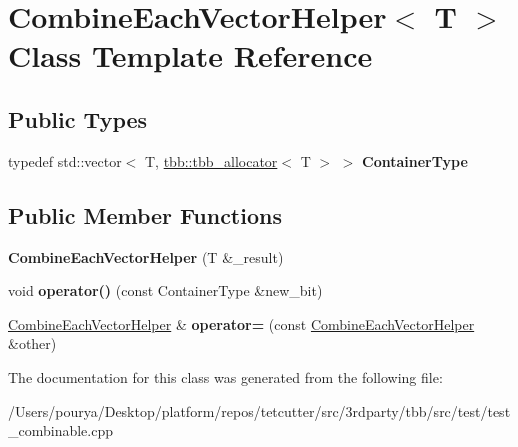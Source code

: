 \hypertarget{classCombineEachVectorHelper}{}\section{Combine\+Each\+Vector\+Helper$<$ T $>$ Class Template Reference}
\label{classCombineEachVectorHelper}
\subsection*{Public Types}
\begin{DoxyCompactItemize}
\item 
\hypertarget{classCombineEachVectorHelper_a8dd89e67cb3a9a74044d47eb2db046dd}{}typedef std\+::vector$<$ T, \hyperlink{classtbb_1_1tbb__allocator}{tbb\+::tbb\+\_\+allocator}$<$ T $>$ $>$ {\bfseries Container\+Type}\label{classCombineEachVectorHelper_a8dd89e67cb3a9a74044d47eb2db046dd}

\end{DoxyCompactItemize}
\subsection*{Public Member Functions}
\begin{DoxyCompactItemize}
\item 
\hypertarget{classCombineEachVectorHelper_afa58f9796aef7526a330f2e743e948e4}{}{\bfseries Combine\+Each\+Vector\+Helper} (T \&\+\_\+result)\label{classCombineEachVectorHelper_afa58f9796aef7526a330f2e743e948e4}

\item 
\hypertarget{classCombineEachVectorHelper_a6e7aa1310046f2ed8c75563f51a38101}{}void {\bfseries operator()} (const Container\+Type \&new\+\_\+bit)\label{classCombineEachVectorHelper_a6e7aa1310046f2ed8c75563f51a38101}

\item 
\hypertarget{classCombineEachVectorHelper_a74a25d82c19a1a42ecdce8fff9cfc6d5}{}\hyperlink{classCombineEachVectorHelper}{Combine\+Each\+Vector\+Helper} \& {\bfseries operator=} (const \hyperlink{classCombineEachVectorHelper}{Combine\+Each\+Vector\+Helper} \&other)\label{classCombineEachVectorHelper_a74a25d82c19a1a42ecdce8fff9cfc6d5}

\end{DoxyCompactItemize}


The documentation for this class was generated from the following file\+:\begin{DoxyCompactItemize}
\item 
/\+Users/pourya/\+Desktop/platform/repos/tetcutter/src/3rdparty/tbb/src/test/test\+\_\+combinable.\+cpp\end{DoxyCompactItemize}
